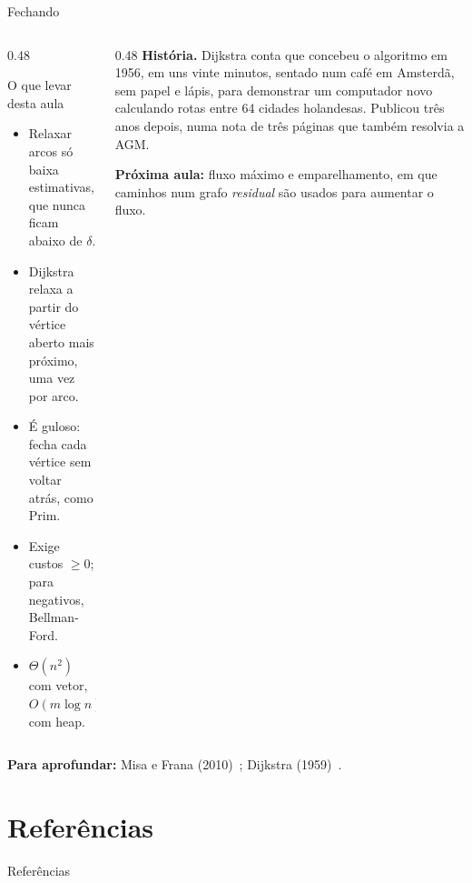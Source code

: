 \documentclass[aspectratio=169,xcolor=table]{beamer}
\newcommand{\fonte}[1]{%
  \vfill
  {\tiny\color{gray!55!black}\textbf{Para aprofundar:} #1\par}%
}
\begin{document}
\begin{frame}{Fechando}
  \begin{columns}[T]
    \begin{column}{0.48\textwidth}
      \begin{block}{O que levar desta aula}
        \scriptsize
        \begin{itemize}
          \item Relaxar arcos só baixa estimativas, que nunca ficam abaixo de $\delta$.
          \item Dijkstra relaxa a partir do vértice aberto mais próximo, uma vez por arco.
          \item É guloso: fecha cada vértice sem voltar atrás, como Prim.
          \item Exige custos $\ge 0$; para negativos, Bellman-Ford.
          \item $\Theta(n^2)$ com vetor, $O(m \log n)$ com heap.
        \end{itemize}
      \end{block}
    \end{column}
    \begin{column}{0.48\textwidth}
      \scriptsize
      \textbf{História.} Dijkstra conta que concebeu o algoritmo em 1956, em uns vinte
      minutos, sentado num café em Amsterdã, sem papel e lápis, para demonstrar um computador
      novo calculando rotas entre 64 cidades holandesas. Publicou três anos depois, numa nota
      de três páginas que também resolvia a AGM.
      \medskip

      \textbf{Próxima aula:} fluxo máximo e emparelhamento, em que caminhos num grafo
      \emph{residual} são usados para aumentar o fluxo.
    \end{column}
  \end{columns}
  \fonte{Misa e Frana (2010)~\cite{misa2010interview}; Dijkstra (1959)~\cite{dijkstra1959note}.}
\end{frame}

\section*{Referências}
\begin{frame}[allowframebreaks]{Referências}
  \tiny
  \nocite{cormen2009introduction,cormen2012algoritmos,kleinberg2006algorithm,dasgupta2008algorithms,levitin2012introduction,feofiloff2020grafos,sedgewick2011algorithms,dijkstra1959note,fredman1987fibonacci,hart1968formal,misa2010interview}
  
  
\end{frame}
\end{document}
